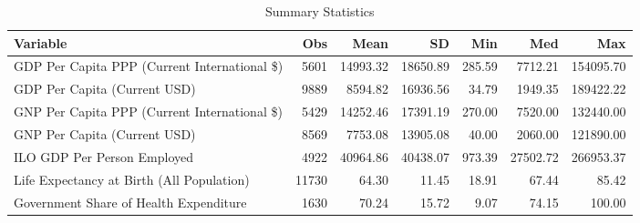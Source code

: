 \begin{table}
\centering
\caption{Summary Statistics}
\label{Sum_Stats}
\begin{tabular}{lrrrrrr}
\toprule
                                    Variable &   Obs &     Mean &       SD &    Min &      Med &       Max \\
\midrule
GDP Per Capita PPP (Current International \$) & 5601 & 14993.32 & 18650.89 & 285.59 & 7712.21 & 154095.70 \\
GDP Per Capita (Current USD) & 9889 & 8594.82 & 16936.56 & 34.79 & 1949.35 & 189422.22 \\
GNP Per Capita PPP (Current International \$) & 5429 & 14252.46 & 17391.19 & 270.00 & 7520.00 & 132440.00 \\
GNP Per Capita (Current USD) & 8569 & 7753.08 & 13905.08 & 40.00 & 2060.00 & 121890.00 \\
ILO GDP Per Person Employed & 4922 & 40964.86 & 40438.07 & 973.39 & 27502.72 & 266953.37 \\
Life Expectancy at Birth (All Population) & 11730 & 64.30 & 11.45 & 18.91 & 67.44 & 85.42 \\
Government Share of Health Expenditure & 1630 & 70.24 & 15.72 & 9.07 & 74.15 & 100.00 \\
\bottomrule
\end{tabular}
\end{table}
